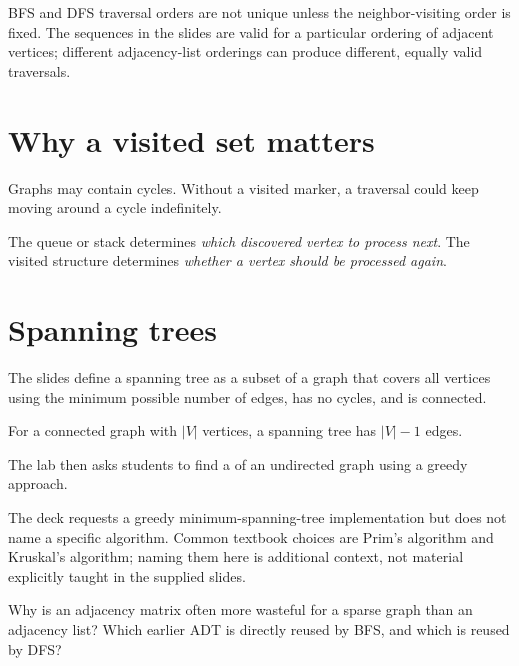 \begin{clarification}
BFS and DFS traversal orders are not unique unless the neighbor-visiting order is fixed. The sequences in the slides are valid for a particular ordering of adjacent vertices; different adjacency-list orderings can produce different, equally valid traversals.
\end{clarification}

\section{Why a visited set matters}

Graphs may contain cycles. Without a visited marker, a traversal could keep moving around a cycle indefinitely.

\begin{keyidea}
The queue or stack determines \emph{which discovered vertex to process next}. The visited structure determines \emph{whether a vertex should be processed again}.
\end{keyidea}

\section{Spanning trees}

The slides define a spanning tree as a subset of a graph that covers all vertices using the minimum possible number of edges, has no cycles, and is connected.

For a connected graph with $|V|$ vertices, a spanning tree has $|V|-1$ edges.

The lab then asks students to find a  of an undirected graph using a greedy approach.

\begin{clarification}
The deck requests a greedy minimum-spanning-tree implementation but does not name a specific algorithm. Common textbook choices are Prim's algorithm and Kruskal's algorithm; naming them here is additional context, not material explicitly taught in the supplied slides.
\end{clarification}

\begin{quickcheck}
Why is an adjacency matrix often more wasteful for a sparse graph than an adjacency list? Which earlier ADT is directly reused by BFS, and which is reused by DFS?
\end{quickcheck}


